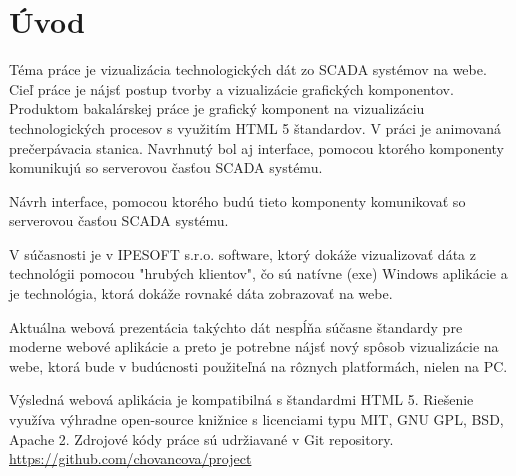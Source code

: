 \chapter*{Úvod}

Téma práce je vizualizácia technologických dát zo SCADA systémov na webe. Cieľ práce je nájsť postup tvorby a vizualizácie grafických komponentov. Produktom bakalárskej práce je grafický komponent na vizualizáciu technologických procesov s využitím HTML 5 štandardov. 
V práci je animovaná prečerpávacia stanica. Navrhnutý bol aj interface, pomocou ktorého komponenty komunikujú so serverovou časťou SCADA systému. 

Návrh  interface, pomocou ktorého budú tieto komponenty komunikovať so serverovou časťou SCADA systému. 

V súčasnosti je v IPESOFT s.r.o. software, ktorý dokáže vizualizovať dáta z technológii pomocou "hrubých klientov",  čo sú natívne (exe) Windows aplikácie a je technológia,  ktorá dokáže rovnaké dáta zobrazovať na webe. 

Aktuálna webová prezentácia takýchto dát nespĺňa súčasne štandardy pre moderne webové aplikácie a preto je potrebne nájsť nový spôsob vizualizácie na webe, ktorá bude v budúcnosti použiteľná na rôznych platformách, nielen na PC. 

Výsledná webová aplikácia je kompatibilná s štandardmi HTML 5. Riešenie využíva výhradne open-source knižnice s licenciami typu MIT, GNU GPL, BSD, Apache 2. Zdrojové kódy práce sú udržiavané v Git repository. \url{https://github.com/chovancova/project} 


%


